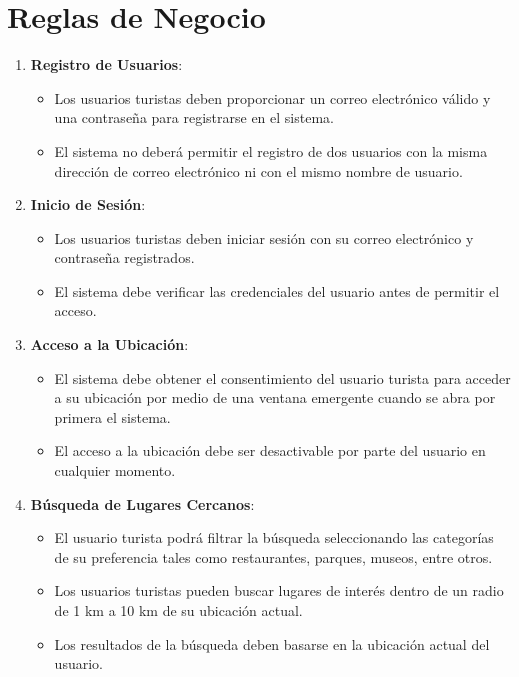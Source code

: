 \documentclass{article}
\begin{document}
\section{Reglas de Negocio}
\begin{enumerate}
    \item \textbf{Registro de Usuarios}:
    \begin{itemize}
        \item Los usuarios turistas deben proporcionar un correo electrónico válido y una contraseña para registrarse en el sistema.
        \item El sistema no deberá permitir el registro de dos usuarios con la misma dirección de correo electrónico ni con el mismo nombre de usuario.
    \end{itemize}
    
    \item \textbf{Inicio de Sesión}:
    \begin{itemize}
        \item Los usuarios turistas deben iniciar sesión con su correo electrónico y contraseña registrados.
        \item El sistema debe verificar las credenciales del usuario antes de permitir el acceso.
    \end{itemize}
    
    \item \textbf{Acceso a la Ubicación}:
    \begin{itemize}
        \item El sistema debe obtener el consentimiento del usuario turista para acceder a su ubicación por medio de una ventana emergente cuando se abra por primera el sistema.
        \item El acceso a la ubicación debe ser desactivable por parte del usuario en cualquier momento.
    \end{itemize}
    
    \item \textbf{Búsqueda de Lugares Cercanos}:
    \begin{itemize}
        \item El usuario turista podrá filtrar la búsqueda seleccionando las categorías de su preferencia tales como restaurantes, parques, museos, entre otros.
        \item Los usuarios turistas pueden buscar lugares de interés dentro de un radio de 1 km a 10 km de su ubicación actual.
        \item Los resultados de la búsqueda deben basarse en la ubicación actual del usuario.
    \end{itemize}
    

\end{enumerate}
\end{document}
